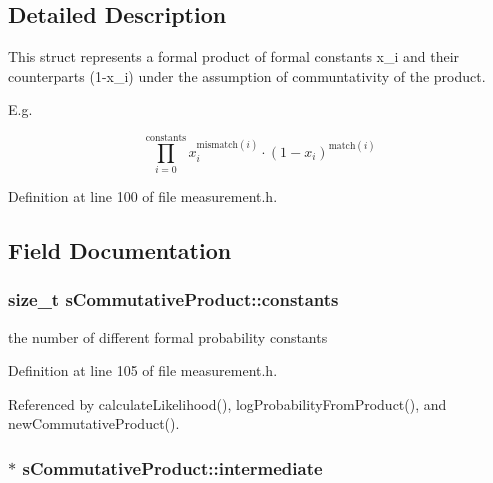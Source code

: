 \subsection{\-Detailed \-Description}
\-This struct represents a formal product of formal constants x\-\_\-i and their counterparts (1-\/x\-\_\-i) under the assumption of communtativity of the product. 

\-E.\-g.

\[ \prod_{i=0}^{\mathrm{constants}} x_i^{\mathrm{mismatch}(i)} \cdot (1-x_i)^{\mathrm{match}(i)} \] 

\-Definition at line 100 of file measurement.\-h.



\subsection{\-Field \-Documentation}
\hypertarget{structsCommutativeProduct_af77351b19630473b2fedc9267665032a}{
\subsubsection[{constants}]{\setlength{\rightskip}{0pt plus 5cm}size\-\_\-t {\bf s\-Commutative\-Product\-::constants}}}\label{structsCommutativeProduct_af77351b19630473b2fedc9267665032a}


the number of different formal probability constants 



\-Definition at line 105 of file measurement.\-h.



\-Referenced by calculate\-Likelihood(), log\-Probability\-From\-Product(), and new\-Commutative\-Product().

\hypertarget{structsCommutativeProduct_a62301df4ed7d412fb3e45fc7f8d6b0f3}{
\subsubsection[{intermediate}]{$\ast$ {\bf s\-Commutative\-Product\-::intermediate}}}\label{structsCommutativeProduct_a62301df4ed7d412fb3e45fc7f8d6b0f3}


